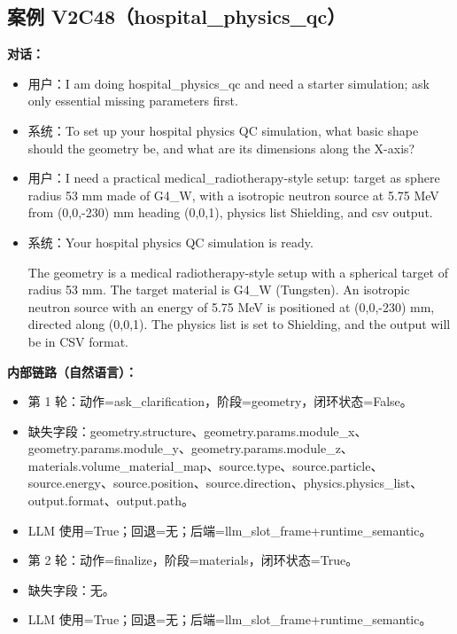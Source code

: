 \documentclass[11pt]{ctexart}
\begin{document}
\subsection{案例 V2C48（hospital\_physics\_qc）}
\textbf{对话：}
\begin{itemize}
\item 用户：I am doing hospital\_physics\_qc and need a starter simulation; ask only essential missing parameters first.
\item 系统：To set up your hospital physics QC simulation, what basic shape should the geometry be, and what are its dimensions along the X-axis?
\item 用户：I need a practical medical\_radiotherapy-style setup: target as sphere radius 53 mm made of G4\_W, with a isotropic neutron source at 5.75 MeV from (0,0,-230) mm heading (0,0,1), physics list Shielding, and csv output.
\item 系统：Your hospital physics QC simulation is ready.

The geometry is a medical radiotherapy-style setup with a spherical target of radius 53 mm. The target material is G4\_W (Tungsten). An isotropic neutron source with an energy of 5.75 MeV is positioned at (0,0,-230) mm, directed along (0,0,1). The physics list is set to Shielding, and the output will be in CSV format.
\end{itemize}
\textbf{内部链路（自然语言）：}
\begin{itemize}
\item 第 1 轮：动作=ask\_clarification，阶段=geometry，闭环状态=False。
\item 缺失字段：geometry.structure、geometry.params.module\_x、geometry.params.module\_y、geometry.params.module\_z、materials.volume\_material\_map、source.type、source.particle、source.energy、source.position、source.direction、physics.physics\_list、output.format、output.path。
\item LLM 使用=True；回退=无；后端=llm\_slot\_frame+runtime\_semantic。
\item 第 2 轮：动作=finalize，阶段=materials，闭环状态=True。
\item 缺失字段：无。
\item LLM 使用=True；回退=无；后端=llm\_slot\_frame+runtime\_semantic。
\end{itemize}
\end{document}
